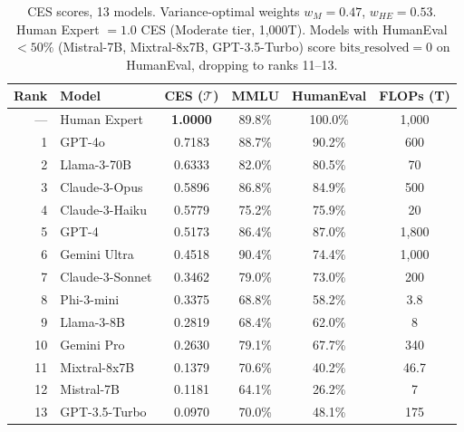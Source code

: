 \documentclass[12pt]{article}
\begin{document}
\begin{table}[H]
\centering
\begin{tabular}{rlcccc}
\toprule
\textbf{Rank} & \textbf{Model} & \textbf{CES} ($\mathcal{T}$) & \textbf{MMLU} & \textbf{HumanEval} & \textbf{FLOPs (T)} \\
\midrule
--- & Human Expert & \textbf{1.0000} & 89.8\% & 100.0\% & 1,000 \\
\midrule
1  & GPT-4o         & 0.7183 & 88.7\% & 90.2\% & 600 \\
2  & Llama-3-70B    & 0.6333 & 82.0\% & 80.5\% & 70 \\
3  & Claude-3-Opus  & 0.5896 & 86.8\% & 84.9\% & 500 \\
4  & Claude-3-Haiku & 0.5779 & 75.2\% & 75.9\% & 20 \\
5  & GPT-4          & 0.5173 & 86.4\% & 87.0\% & 1,800 \\
6  & Gemini Ultra   & 0.4518 & 90.4\% & 74.4\% & 1,000 \\
7  & Claude-3-Sonnet& 0.3462 & 79.0\% & 73.0\% & 200 \\
8  & Phi-3-mini     & 0.3375 & 68.8\% & 58.2\% & 3.8 \\
9  & Llama-3-8B     & 0.2819 & 68.4\% & 62.0\% & 8 \\
10 & Gemini Pro     & 0.2630 & 79.1\% & 67.7\% & 340 \\
11 & Mixtral-8x7B   & 0.1379 & 70.6\% & 40.2\% & 46.7 \\
12 & Mistral-7B     & 0.1181 & 64.1\% & 26.2\% & 7 \\
13 & GPT-3.5-Turbo  & 0.0970 & 70.0\% & 48.1\% & 175 \\
\bottomrule
\end{tabular}
\caption{CES scores, 13 models. Variance-optimal weights $w_M=0.47$, $w_{HE}=0.53$. Human Expert $= 1.0$ CES (Moderate tier, 1,000T). Models with HumanEval $< 50\%$ (Mistral-7B, Mixtral-8x7B, GPT-3.5-Turbo) score $\text{bits\_resolved}=0$ on HumanEval, dropping to ranks 11--13.}
\label{tab:ces-main}
\end{table}
\end{document}
